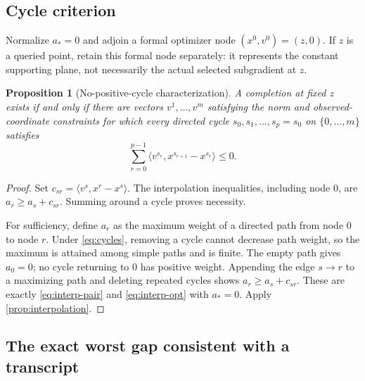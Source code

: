 \documentclass[11pt]{article}
\numberwithin{equation}{section}
\newtheorem{proposition}[proposition]{Proposition}
\theoremstyle{definition}
\theoremstyle{remark}
\newcommand{\ip}[2]{\langle #1,#2\rangle}
\begin{document}
\subsection{Cycle criterion}

Normalize $a_*=0$ and adjoin a formal optimizer node $(x^0,v^0)=(z,0)$. If $z$ is a queried point, retain this formal node separately: it represents the constant supporting plane, not necessarily the actual selected subgradient at $z$.

\begin{proposition}[No-positive-cycle characterization]\label{prop:cycles}
A completion at fixed $z$ exists if and only if there are vectors $v^1,\ldots,v^m$ satisfying the norm and observed-coordinate constraints for which every directed cycle $s_0,s_1,\ldots,s_p=s_0$ on $\{0,\ldots,m\}$ satisfies
\begin{equation}\label{eq:cycles}
\sum_{r=0}^{p-1}\ip{v^{s_r}}{x^{s_{r+1}}-x^{s_r}}\le0.
\end{equation}
\end{proposition}
\begin{proof}
Set $c_{sr}=\ip{v^s}{x^r-x^s}$. The interpolation inequalities, including node 0, are $a_r\ge a_s+c_{sr}$. Summing around a cycle proves necessity.

For sufficiency, define $a_r$ as the maximum weight of a directed path from node 0 to node $r$. Under \eqref{eq:cycles}, removing a cycle cannot decrease path weight, so the maximum is attained among simple paths and is finite. The empty path gives $a_0=0$; no cycle returning to 0 has positive weight. Appending the edge $s\to r$ to a maximizing path and deleting repeated cycles shows $a_r\ge a_s+c_{sr}$. These are exactly \eqref{eq:interp-pair} and \eqref{eq:interp-opt} with $a_*=0$. Apply \cref{prop:interpolation}.
\end{proof}

\subsection{The exact worst gap consistent with a transcript}
\end{document}
